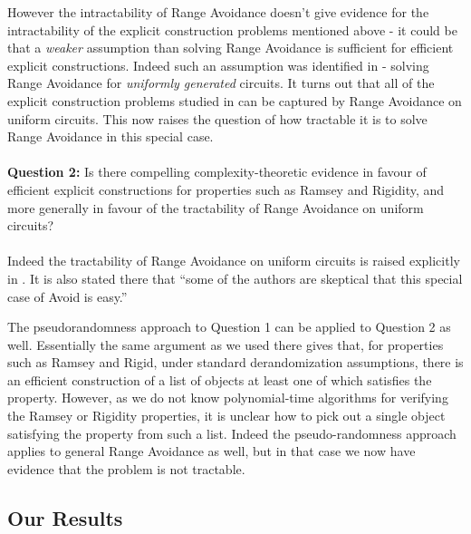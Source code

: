 \documentclass[11pt]{article}
\begin{document}
However the intractability of Range Avoidance doesn't give evidence for the intractability of the explicit construction problems mentioned above - it could be that a {\it weaker} assumption than solving Range Avoidance is sufficient for efficient explicit constructions. Indeed such an assumption was identified in \cite{ILW23} - solving Range Avoidance for {\it uniformly generated} circuits. It turns out that all of the explicit construction problems studied in \cite{Korten21} can be captured by Range Avoidance on uniform circuits. This now raises the question of how tractable it is to solve Range Avoidance in this special case. \\
\\
{\bf \noindent Question 2:} Is there compelling complexity-theoretic evidence in favour of efficient explicit constructions for properties such as Ramsey and Rigidity, and more generally in favour of the tractability of Range Avoidance on uniform circuits? \\
\\
Indeed the tractability of Range Avoidance on uniform circuits is raised explicitly in \cite{ILW23}. It is also stated there that ``some of the authors are skeptical that this special case of Avoid is easy.''

The pseudorandomness approach to Question 1 can be applied to Question 2 as well. Essentially the same argument as we used there gives that, for properties such as Ramsey and Rigid, under standard derandomization assumptions, there is an efficient construction of a list of objects at least one of which satisfies the property. However, as we do not know polynomial-time algorithms for verifying the Ramsey or Rigidity properties, it is unclear how to pick out a single object satisfying the property from such a list. Indeed the pseudo-randomness approach applies to general Range Avoidance as well, but in that case we now have evidence that the problem is not tractable.


\subsection{Our Results}
\end{document}
